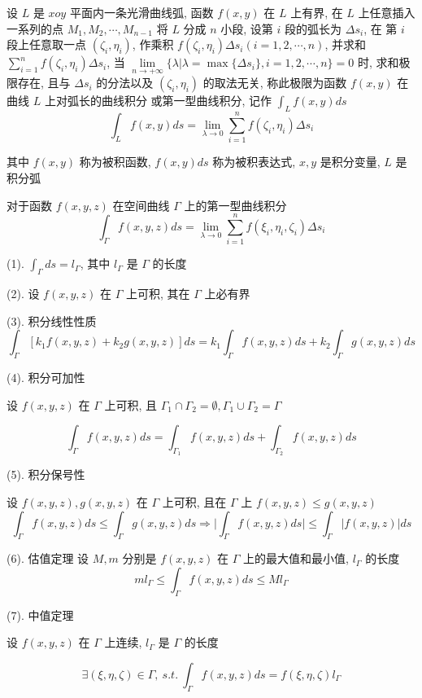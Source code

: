 \begin{definition}[第一型曲线积分]
	设 $L$ 是 $xoy$ 平面内一条光滑曲线弧, 函数 $f(x,y)$ 在 $L$ 上有界, 在 $L$ 上任意插入一系列的点 $M_{1}, M_{2}, \cdots, M_{n-1}$ 将 $L$ 分成 $n$ 小段, 设第 $i$ 段的弧长为 $\Delta s_{i}$, 
	在 第 $i$ 段上任意取一点 $(\zeta_{i},\eta_{i})$, 作乘积 $f(\zeta_{i},\eta_{i})\Delta s_{i}(i=1,2,\cdots,n)$, 并求和 $\sum\limits_{i=1}^{n}f(\zeta_{i},\eta_{i})\Delta s_{i}$, 当 
	$\lim\limits_{n \to +\infty}\{\lambda|\lambda = \max\{\Delta s_{i}\}, i =1,2,\cdots,n\} = 0$ 时, 求和极限存在, 
	且与 $\Delta s_{i}$ 的分法以及 $(\zeta_{i},\eta_{i})$ 的取法无关, 称此极限为函数 $f(x,y)$ 在曲线 $L$ 上对弧长的曲线积分
	或第一型曲线积分, 记作 $\int_{L}f(x,y)ds$
	$$\int_{L}f(x,y)ds = \lim\limits_{\lambda \to 0}\sum\limits_{i=1}^{n}f(\zeta_{i},\eta_{i})\Delta s_{i}$$ 

	其中 $f(x,y)$ 称为被积函数, $f(x,y)ds$ 称为被积表达式, $x,y$ 是积分变量, $L$ 是积分弧

	对于函数 $f(x,y,z)$ 在空间曲线 $\Gamma$ 上的第一型曲线积分
	$$\int_{\Gamma}f(x,y,z)ds = \lim\limits_{\lambda \to 0}\sum\limits_{i=1}^{n}f(\xi_{i},\eta_{i},\zeta_{i})\Delta s_{i}$$
\end{definition}
\begin{corollary}

	(1). $\displaystyle{\int_{\Gamma} ds = l_{\Gamma}}$, 其中 $l_{\Gamma}$ 是 $\Gamma$ 的长度

	(2). 设 $f(x,y,z)$ 在 $\Gamma$ 上可积, 其在 $\Gamma$ 上必有界

	(3). 积分线性性质
	$$\int_{\Gamma}\left[k_{1}f(x,y,z) + k_{2} g(x,y,z)\right]ds = k_{1}\int_{\Gamma}f(x,y,z)ds+k_{2}\int_{\Gamma}g(x,y,z)ds$$

	(4). 积分可加性

	设 $f(x,y,z)$ 在 $\Gamma$ 上可积, 且 $\Gamma_{1}\cap \Gamma_{2}=\emptyset, \Gamma_{1}\cup \Gamma_{2}=\Gamma$

	$$\int_{\Gamma}f(x,y,z)ds = \int_{\Gamma_{1}}f(x,y,z)ds + \int_{\Gamma_{2}}f(x,y,z)ds$$

	(5). 积分保号性

	设 $f(x,y,z), g(x,y,z)$ 在 $\Gamma$ 上可积, 且在 $\Gamma$ 上 $f(x,y,z) \leq g(x,y,z)$
	$$\int_{\Gamma}f(x,y,z)ds \leq \int_{\Gamma}g(x,y,z)ds\Rightarrow \big|\int_{\Gamma}f(x,y,z)ds\big| \leq \int_{\Gamma}\big|f(x,y,z)\big|ds$$

	(6). 估值定理
	设 $M,m$ 分别是 $f(x,y,z)$ 在 $\Gamma$ 上的最大值和最小值, $l_{\Gamma}$ 的长度
	$$ml_{\Gamma} \leq \int_{\Gamma}f(x,y,z)ds \leq Ml_{\Gamma}$$

	(7). 中值定理

	设 $f(x,y,z)$ 在 $\Gamma$ 上连续, $l_{\Gamma}$ 是 $\Gamma$ 的长度

	$$\exists (\xi,\eta,\zeta)\in \Gamma,\ s.t.\ \int_{\Gamma}f(x,y,z) ds = f(\xi,\eta,\zeta)l_{\Gamma}$$
\end{corollary}

